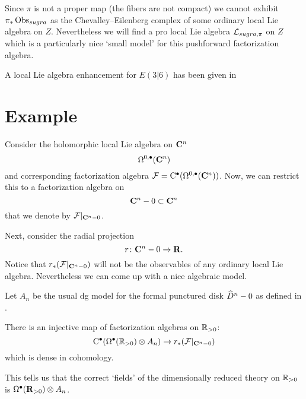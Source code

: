 Since $\pi$ is not a proper map (the fibers are not compact) we cannot exhibit $\pi_*\Obs_{sugra}$ as the Chevalley--Eilenberg complex of some ordinary local Lie algebra on $Z$. 
Nevertheless we will find a pro local Lie algebra $\cL_{sugra,\pi}$ on $Z$ which is a particularly nice `small model' for this pushforward factorization algebra.

A local Lie algebra enhancement for $E(3|6)$ has been given in \cite{SWsuca6d} 







\section{Example} 

Consider the holomorphic local Lie algebra on $\C^n$
\[
\Omega^{0,\bu}(\C^n) 
\]
and corresponding factorization algebra $\cF = \clie^\bu(\Omega^{0,\bu}(\C^n))$. 
Now, we can restrict this to a factorization algebra on
\[
\C^n - 0 \subset \C^n
\]
that we denote by $\cF|_{\C^n - 0}$. 

Next, consider the radial projection
\[
r \colon \C^n - 0 \to \R .
\]
Notice that $r_* (\cF|_{\C^n - 0})$ will not be the observables of any ordinary local Lie algebra.
Nevertheless we can come up with a nice algebraic model.  

Let $A_n$ be the usual dg model for the formal punctured disk $\Hat{D}^n - 0$ as defined in \cite{FHK,GWkm}.

\begin{lem}
There is an injective map of factorization algebras on $\RR_{>0}$:
\[
\clie^\bu(\Omega^\bu(\RR_{>0}) \otimes A_n) \to r_* (\cF|_{\C^n - 0}) 
\]
which is dense in cohomology.
\end{lem}

This tells us that the correct `fields' of the dimensionally reduced theory on $\RR_{>0}$ is $\Omega^\bu(\R_{>0}) \otimes A_n$. 


%

